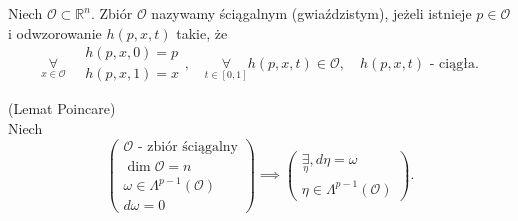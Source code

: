 \documentclass[../main.tex]{subfiles}
\begin{document}
\begin{definicja}
    Niech $\mathcal{O}\subset\mathbb{R}^n$. Zbiór $\mathcal{O}$ nazywamy ściągalnym (gwiaździstym), jeżeli istnieje $p\in \mathcal{O}$ i odwzorowanie $h(p,x,t)$ takie, że
    \[
        \underset{x\in\mathcal{O}}{\forall}\quad \begin{matrix}h(p,x,0) = p\\ h(p,x,1) = x\end{matrix},\quad \underset{t\in[0,1]}{\forall}  h(p,x,t)\in \mathcal{O}, \quad h(p,x,t) \text{ - ciągła}
    .\]
\end{definicja}
\begin{tw}
    (Lemat Poincare)\\
    Niech
    \[
        \begin{pmatrix}\mathcal{O} \text{ - zbiór ściągalny}\\ \dim \mathcal{O} = n\\ \omega\in\Lambda^{p-1}(\mathcal{O})\\ d\omega = 0\end{pmatrix} \implies \begin{pmatrix} \underset{\eta}{\exists}, d\eta = \omega \\ \eta\in\Lambda^{p-1}(\mathcal{O}) \end{pmatrix}
    .\]
\end{tw}
\end{document}
